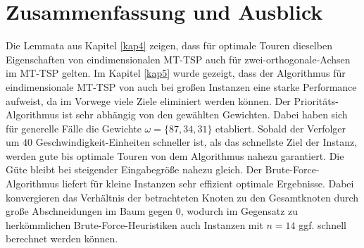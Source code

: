 \documentclass[german,version-2019-11]{uzl-thesis}
\begin{document}
\begin{table}[htpb]
\centering
{}
\caption{Ziele mit gleichen Geschwindigkeiten im Prioritäts-Algorithmus}
\label{tab:ExpPrio}
\end{table}

\chapter{Zusammenfassung und Ausblick}
Die Lemmata aus Kapitel \ref{kap4} zeigen, dass für optimale Touren dieselben Eigenschaften von eindimensionalen MT-TSP auch für zwei-orthogonale-Achsen im MT-TSP gelten. Im Kapitel \ref{kap5} wurde gezeigt, dass der Algorithmus für eindimensionale MT-TSP von \cite{helvig} auch bei großen Instanzen eine starke Performance aufweist, da im Vorwege viele Ziele eliminiert werden können. 
Der Prioritäts-Algorithmus ist sehr abhängig von den gewählten Gewichten. Dabei haben sich für generelle Fälle die Gewichte $\omega=\{87,34,31\}$ etabliert. Sobald der Verfolger um $40$ Geschwindigkeit-Einheiten schneller ist, als das schnellste Ziel der Instanz, werden gute bis optimale Touren von dem Algorithmus nahezu garantiert. Die Güte bleibt bei steigender Eingabegröße nahezu gleich. Der Brute-Force-Algorithmus liefert für kleine Instanzen sehr effizient optimale Ergebnisse. Dabei konvergieren das Verhältnis der betrachteten Knoten zu den Gesamtknoten durch große Abschneidungen im Baum gegen $0$, wodurch im Gegensatz zu herkömmlichen Brute-Force-Heuristiken auch Instanzen mit $n=14$ ggf. schnell berechnet werden können. 
\end{document}
